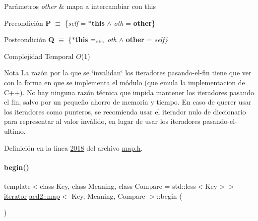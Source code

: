 \begin{DoxyParams}{Parámetros}
{\em other} & mapa a intercambiar con this\\
\hline
\end{DoxyParams}
\begin{DoxyPrecond}{Precondición}
{\bfseries P} $\equiv$ \{{\itshape self} = {\bfseries $\ast$this} $\land$ {\itshape oth} = {\bfseries other}\} 
\end{DoxyPrecond}
\begin{DoxyPostcond}{Postcondición}
{\bfseries Q} $\equiv$ \{{\bfseries $\ast$this} $=_{\rm obs}$ {\itshape oth} $\land$ {\bfseries other} = {\itshape self\}} 
\end{DoxyPostcond}

\begin{DoxyDescription}
\item[Complejidad Temporal]$O$(1)
\end{DoxyDescription}

\begin{DoxyNote}{Nota}
La razón por la que se \char`\"{}invalidan\char`\"{} los iteradores pasando-\/el-\/fin tiene que ver con la forma en que se implementa el módulo (que emula la implementacion de C++). No hay ninguna razón técnica que impida mantener los iteradores pasando el fin, salvo por un pequeño ahorro de memoria y tiempo. En caso de querer usar los iteradores como punteros, se recomienda usar el iterador nulo de diccionario para representar al valor inválido, en lugar de usar los iteradores pasando-\/el-\/ultimo. 
\end{DoxyNote}


Definición en la línea \hyperlink{map_8h_source_l02018}{2018} del archivo \hyperlink{map_8h_source}{map.\+h}.

\mbox{\label{classaed2_1_1map_a58a95705d54b3dda7f775ce5a22225cb_a58a95705d54b3dda7f775ce5a22225cb}} 
\paragraph{\texorpdfstring{begin()}{begin()}\hspace{0.1cm}{\footnotesize\ttfamily [1/2]}}
{\footnotesize\ttfamily template$<$class Key, class Meaning, class Compare = std\+::less$<$\+Key$>$$>$ \\
\hyperlink{classaed2_1_1map_1_1iterator}{iterator} \hyperlink{classaed2_1_1map}{aed2\+::map}$<$ Key, Meaning, Compare $>$\+::begin (\begin{DoxyParamCaption}{ }\end{DoxyParamCaption})\hspace{0.3cm}{\ttfamily [inline]}}



